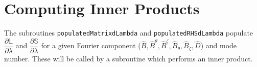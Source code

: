 \documentclass[11pt]{amsart}
\newcommand{\partder}[2]{\dfrac{\partial #1}{\partial #2}} %
\begin{document}
\section{Computing Inner Products}
The subroutines \texttt{populatedMatrixdLambda} and \texttt{populatedRHSdLambda} populate $\partder{\mathbb{L}}{\lambda}$ and $\partder{\mathbb{S}}{\lambda}$ for a given Fourier component ($\hat{B}, \hat{B}^{\theta}, \hat{B}^{\zeta}, \hat{B}_{\theta}, \hat{B}_{\zeta}, \hat{D}$) and mode number. These will be called by a subroutine which performs an inner product. 
\end{document}
